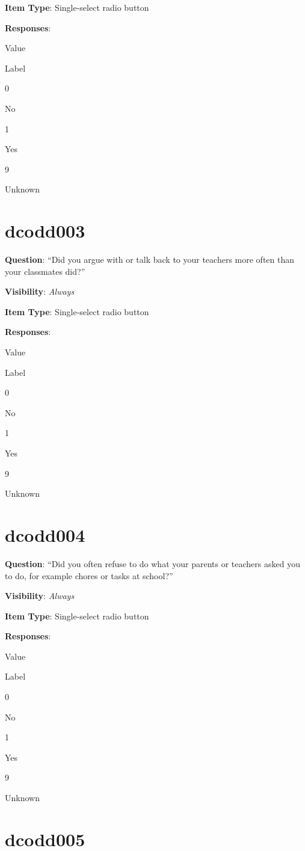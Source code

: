 \documentclass[]{book}
\begin{document}
\textbf{Item Type}: Single-select radio button

\textbf{Responses}:

Value

Label

0

No

1

Yes

9

Unknown

\hypertarget{dcodd003}{%
\section{dcodd003}\label{dcodd003}}

\textbf{Question}: ``Did you argue with or talk back to your teachers more often than your classmates did?''

\textbf{Visibility}: \emph{Always}

\textbf{Item Type}: Single-select radio button

\textbf{Responses}:

Value

Label

0

No

1

Yes

9

Unknown

\hypertarget{dcodd004}{%
\section{dcodd004}\label{dcodd004}}

\textbf{Question}: ``Did you often refuse to do what your parents or teachers asked you to do, for example chores or tasks at school?''

\textbf{Visibility}: \emph{Always}

\textbf{Item Type}: Single-select radio button

\textbf{Responses}:

Value

Label

0

No

1

Yes

9

Unknown

\hypertarget{dcodd005}{%
\section{dcodd005}\label{dcodd005}}
\end{document}
